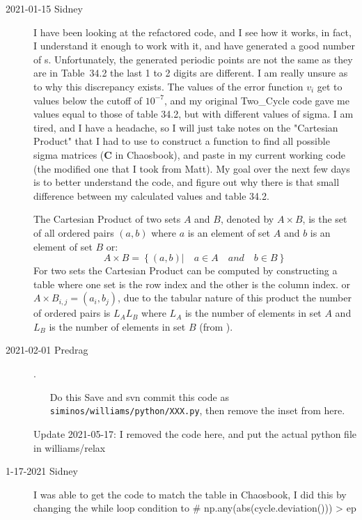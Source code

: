 \begin{description}
\item[2021-01-15 Sidney]
I have been looking at the refactored code, and I see how it works, in fact, I understand it enough to work with it, and have generated a good number of {\orbit}s. Unfortunately, the generated periodic points are not the same as they are in  {Table~34.2} the last 1 to 2 digits are different. I am really unsure as to why this discrepancy exists. The values of the error function $v_i$ get to values below the cutoff of $10^{-7}$, and my original Two\_Cycle code gave me values equal to those of table 34.2, but with different values of sigma. I am tired, and I have a headache, so I will just take notes on the "Cartesian Product" that I had to use to construct a function to find all possible sigma matrices ($\textbf{C}$ in Chaosbook), and paste in my current working code (the modified one that I took from Matt). My goal over the next few days is to better understand the code, and figure out why there is that small difference between my calculated values and table 34.2.

\vspace{3mm}

The Cartesian Product of two sets $A$ and $B$, denoted by $A{\times}B$,
is the set of all ordered pairs $(a,b)$ where $a$ is an element of set
$A$ and $b$ is an element of set $B$ or:
$$A{\times}B=\left\lbrace(a,b)|\quad a\in A\quad and\quad b\in B\right\rbrace$$
For two sets the Cartesian Product can be computed by constructing a
table where one set is the row index and the other is the column index.
or $A{\times}B_{i,j}=(a_i,b_j)$, due to the tabular nature of this product the
number of ordered pairs is $L_AL_B$ where $L_A$ is the number of elements
in set $A$ and $L_B$ is the number of elements in set $B$ (from
).

\item[2021-02-01 Predrag].
    \begin{itemize}
        \item[Do this]
Save and svn commit this code as \texttt{siminos/williams/python/XXX.py},
then remove the inset from here.
    \end{itemize}
Update 2021-05-17: I removed the code here, and put the actual python file in williams/relax

\item[1-17-2021 Sidney]
I was able to get the code to match the table in Chaosbook, I did this by changing the while loop condition to
\# np.any(abs(cycle.deviation())) > ep


\end{description}

